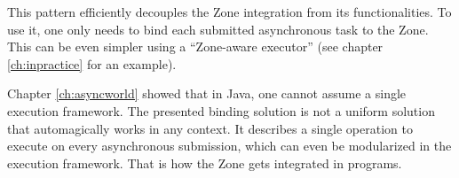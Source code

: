 This pattern efficiently decouples the Zone integration from its functionalities. To use it, one only needs to bind each submitted asynchronous task to the Zone. This can be even simpler using a ``Zone-aware executor'' (see chapter \ref{ch:inpractice} for an example).

Chapter \ref{ch:asyncworld} showed that in Java, one cannot assume a single execution framework. The presented binding solution is not a uniform solution that automagically works in any context. It describes a single operation to execute on every asynchronous submission, which can even be modularized in the execution framework. That is how the Zone gets integrated in programs.


